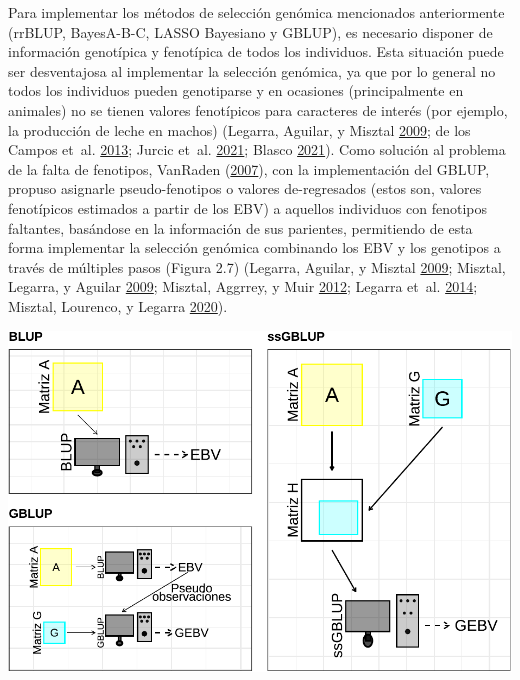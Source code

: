 \documentclass[11pt,spanish,a4paper,oneside,]{book} %
\begin{document}
Para implementar los métodos de selección genómica mencionados anteriormente (rrBLUP, BayesA-B-C, LASSO Bayesiano y GBLUP), es necesario disponer de información genotípica y fenotípica de todos los individuos. Esta situación puede ser desventajosa al implementar la selección genómica, ya que por lo general no todos los individuos pueden genotiparse y en ocasiones (principalmente en animales) no se tienen valores fenotípicos para caracteres de interés (por ejemplo, la producción de leche en machos) (Legarra, Aguilar, y Misztal \protect\hyperlink{ref-cite:17}{2009}; de los Campos et~al. \protect\hyperlink{ref-cite:31}{2013}; Jurcic et~al. \protect\hyperlink{ref-cite:11}{2021}; Blasco \protect\hyperlink{ref-cite:21}{2021}). Como solución al problema de la falta de fenotipos, VanRaden (\protect\hyperlink{ref-cite:39}{2007}), con la implementación del GBLUP, propuso asignarle pseudo-fenotipos o valores de-regresados (estos son, valores fenotípicos estimados a partir de los EBV) a aquellos individuos con fenotipos faltantes, basándose en la información de sus parientes, permitiendo de esta forma implementar la selección genómica combinando los EBV y los genotipos a través de múltiples pasos (Figura 2.7) (Legarra, Aguilar, y Misztal \protect\hyperlink{ref-cite:17}{2009}; Misztal, Legarra, y Aguilar \protect\hyperlink{ref-cite:16}{2009}; Misztal, Aggrrey, y Muir \protect\hyperlink{ref-cite:14}{2012}; Legarra et~al. \protect\hyperlink{ref-cite:15}{2014}; Misztal, Lourenco, y Legarra \protect\hyperlink{ref-cite:18}{2020}).

\begin{center}\includegraphics[width=1\linewidth]{figures/BLUPs_2} \end{center}
\end{document}
